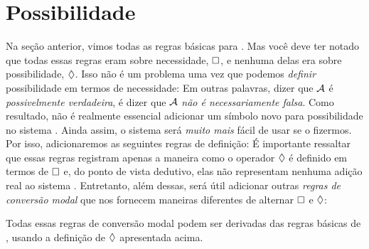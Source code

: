 
\section{Possibilidade}
\label{possibility}

Na seção anterior, vimos todas as regras básicas para \mlK. Mas você deve ter notado que todas essas regras eram sobre necessidade,  $\Box$, e nenhuma delas era sobre possibilidade, $\Diamond$. Isso não é um problema uma vez que podemos \emph{definir} possibilidade em termos de necessidade:
Em outras palavras, dizer que $\mathcal{A}$ é \emph{possivelmente verdadeira}, é dizer que $\mathcal{A}$   \emph{não é necessariamente falsa}. Como resultado, não é realmente essencial adicionar um símbolo novo para possibilidade  no sistema \mlK. Ainda assim, o sistema será \emph{muito mais} fácil de usar se o fizermos. Por isso, adicionaremos as seguintes regras de definição:
É importante ressaltar que essas regras registram apenas a maneira como  o operador $\Diamond$  é definido em termos de $\Box$ e, do ponto de vista dedutivo, elas não representam nenhuma adição real ao sistema \mlK. Entretanto, além dessas,  será útil adicionar outras \emph{regras de conversão modal} que nos fornecem maneiras  diferentes de alternar  $\Box$  e $\Diamond$:
 

Todas essas regras de conversão modal podem ser derivadas das regras básicas de \mlK, usando a  definição de $\Diamond$ apresentada acima. 

